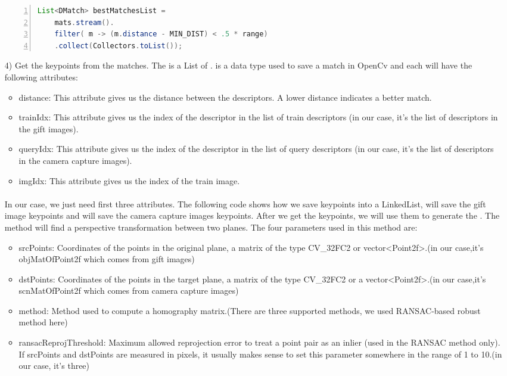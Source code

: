 \begin{enumerate}
\begin{lstlisting}[caption={Matching Descriptor Vectors},language={java},
        numbers=left,basicstyle=\footnotesize\ttfamily,breaklines=true,xleftmargin=.05\textwidth, xrightmargin=.05\textwidth]
List<DMatch> bestMatchesList = 
    mats.stream().
    filter( m -> (m.distance - MIN_DIST) < .5 * range)
    .collect(Collectors.toList());
\end{lstlisting} 
\item[4)] Get the keypoints from the  matches. The  is a List of .  is a data type used to save a match in OpenCv and each  will have the following attributes:
\begin{itemize}
\item distance: This attribute gives us the distance between the descriptors. A lower distance indicates a better match.
\item trainIdx: This attribute gives us the index of the descriptor in the list of train descriptors (in our case, it’s the list of descriptors in the gift images).
\item queryIdx: This attribute gives us the index of the descriptor in the list of query descriptors (in our case, it’s the list of descriptors in the camera capture images).
\item imgIdx: This attribute gives us the index of the train image. 
\end{itemize}
\paragraph{} In our case, we just need first three attributes. The following code shows how we save keypoints into a {\ttfamily LinkedList},  will save the gift image keypoints and  will save the camera capture images keypoints. After we get the keypoints, we will use them to generate the . The  method will find a perspective transformation between two planes. The four parameters used in this method are:
\begin{itemize}
\item srcPoints: Coordinates of the points in the original plane, a matrix of the type CV\_32FC2 or vector\textless Point2f\textgreater.(in our case,it's objMatOfPoint2f which comes from gift images)
\item dstPoints: Coordinates of the points in the target plane, a matrix of the type CV\_32FC2 or a vector\textless Point2f\textgreater .(in our case,it's scnMatOfPoint2f which comes from camera capture images)
\item method: Method used to compute a homography matrix.(There are three supported methods, we used RANSAC-based robust method here)
\item ransacReprojThreshold: Maximum allowed reprojection error to treat a point pair as an inlier (used in the RANSAC method only). If srcPoints and dstPoints are measured in pixels, it usually makes sense to set this parameter somewhere in the range of 1 to 10.(in our case, it's three)
\end{itemize}


\end{enumerate}
